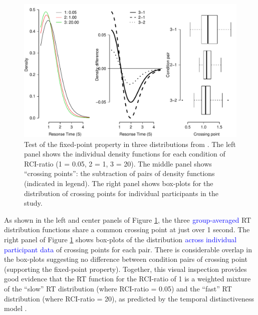 \documentclass[a4paper, man, natbib]{apa6}
\newcommand{\jg}[1]{\textcolor{blue}{$^{\textrm{}}${#1}}}
\begin{document}
\begin{figure}
\begin{center}
\includegraphics[width = \textwidth]{Images/mixtureDistributionData.pdf}
\caption{Test of the fixed-point property in three distributions from \cite{Grangeinrevision}. The left panel shows the individual density functions for each condition of RCI-ratio (1 = 0.05, 2 = 1, 3 = 20). The middle panel shows ``crossing points'': the subtraction of pairs of density functions (indicated in legend). The right panel shows box-plots for the distribution of crossing points for individual participants in the study.}
\label{fig:mixtureDistributionData}
\end{center}
\end{figure}

As shown in the left and center panels of Figure \ref{fig:mixtureDistributionData}, the three \jg{group-averaged} RT distribution functions share a common crossing point at just over 1 second. The right panel of Figure \ref{fig:mixtureDistributionData} shows box-plots of the distribution \jg{across individual participant data} of crossing points for each pair. There is considerable overlap in the box-plots suggesting no difference between condition pairs of crossing point (supporting the fixed-point property). Together, this visual inspection provides good evidence that the RT function for the RCI-ratio of 1 is a weighted mixture of the ``slow'' RT distribution (where RCI-ratio = 0.05) and the ``fast'' RT distribution (where RCI-ratio = 20), as predicted by the temporal distinctiveness model \citep{Grange2015}.
\end{document}
